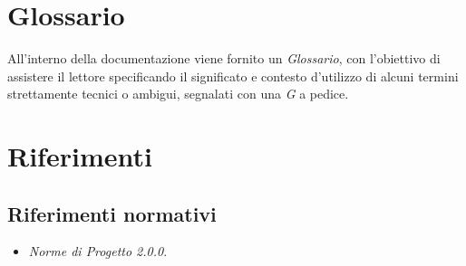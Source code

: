 \section{Glossario}\label{IntroduzioneGlossario}
All'interno della documentazione viene fornito un \textit{Glossario}, con l'obiettivo di assistere il lettore specificando il significato e contesto d'utilizzo di alcuni termini strettamente tecnici o ambigui, segnalati con una \textit{G} a pedice.

\section{Riferimenti}\label{IntroduzioneRiferimenti}

\subsection{Riferimenti normativi}\label{IntroduzioneRiferimentiRiferimentiNormativi}
\begin{itemize}
	\item \textit{Norme di Progetto 2.0.0}.
\end{itemize}

